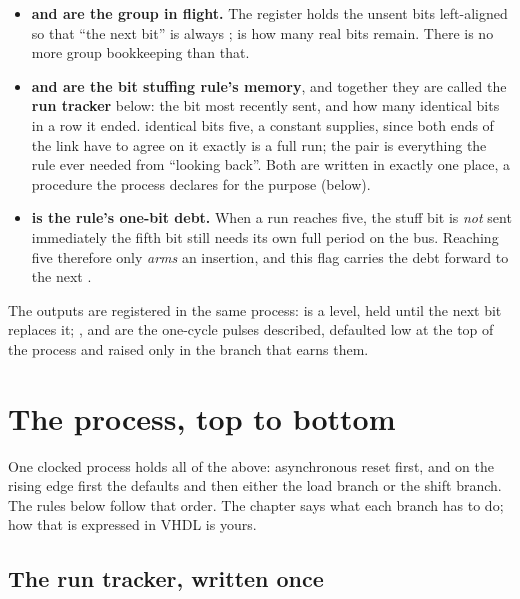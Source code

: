 \begin{itemize}
  \item \textbf{ and  are the group in flight.} The register holds
    the unsent bits left-aligned so that ``the next bit'' is always ;
     is how many real bits remain. There is no more group bookkeeping than that.
  \item \textbf{ and  are the bit stuffing rule's memory}, and
    together they are called the \textbf{run tracker} below: the bit most recently sent, and how many
    identical bits in a row it ended.  identical bits \textemdash{} five, a constant
     supplies, since both ends of the link have to agree on it exactly \textemdash{} is
    a full run; the pair is everything the rule ever needed from ``looking back''. Both are written
    in exactly one place, a procedure the process declares for the purpose (below).
  \item \textbf{ is the rule's one-bit debt.} When a run reaches five, the stuff
    bit is \emph{not} sent immediately \textemdash{} the fifth bit still needs its own full period on
    the bus. Reaching five therefore only \emph{arms} an insertion, and this flag carries the debt
    forward to the next .
\end{itemize}

The outputs are registered in the same process:  is a level, held until the next bit
replaces it; ,  and  are the one-cycle pulses
 described, defaulted low at the top of the process and raised only in the
branch that earns them.

\section{The process, top to bottom}
\label{c14:sec:process}

One clocked process holds all of the above: asynchronous reset first, and on the rising edge first the
defaults and then either the load branch or the shift branch. The rules below follow that order. The
chapter says what each branch has to do; how that is expressed in VHDL is yours.

\subsection{The run tracker, written once}
\label{c14:sub:tracker}

